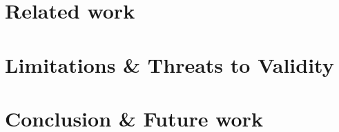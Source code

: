 \documentclass[runningheads]{llncs}
\begin{document}
\section{Related work}


\cite{krauterFormalizationAnalysisBPMN2023} %

\cite{vangorpVisualTokenbasedFormalization2013}

\cite{corradiniBProVeToolSupport2017,corradiniFormalApproachAnalysis2021}

\section{Limitations \& Threats to Validity}

\section{Conclusion \& Future work}

 

\end{document}
